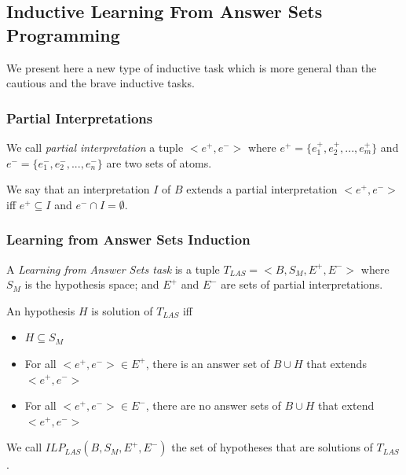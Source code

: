 
\subsection{Inductive Learning From Answer Sets Programming}

We present here a new type of inductive task which is more general than the cautious and the brave inductive tasks.

\subsubsection{Partial Interpretations}

We call \textit{partial interpretation} a tuple $<e^+,e^->$ where $e^+=\{e^+_1,e^+_2,...,e^+_m\}$ and $e^-=\{e^-_1,e^-_2,...,e^-_n\}$ are two sets of atoms.

\smallskip

We say that an interpretation $I$ of $B$ extends a partial interpretation $<e^+,e^->$ iff $e^+ \subseteq I$ and $e^- \cap I = \emptyset$.

\subsubsection{Learning from Answer Sets Induction}

\begin{definition}

A \textit{Learning from Answer Sets task} is a tuple $T_{LAS}=<B, S_M, E^+, E^->$ where $S_M$ is the hypothesis space; and $E^+$ and $E^-$ are sets of partial interpretations. 

\smallskip

An hypothesis $H$ is solution of $T_{LAS}$ iff 
\begin{itemize}
\item $H\subseteq S_M$
\item For all  $<e^+,e^->\in E^+$, there is an answer set of $B\cup H$ that extends $<e^+,e^->$
\item For all  $<e^+,e^->\in E^-$, there are no answer sets of $B\cup H$ that extend $<e^+,e^->$
\end{itemize}

We call $ILP_{LAS}(B,S_M,E^+,E^-)$ the set of hypotheses that are solutions of $T_{LAS}$. 
\end{definition}

